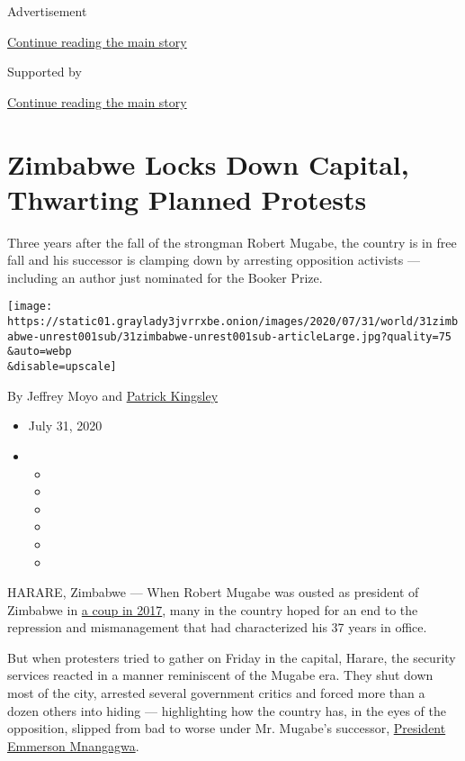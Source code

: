 Advertisement

\protect\hyperlink{after-top}{Continue reading the main story}

Supported by

\protect\hyperlink{after-sponsor}{Continue reading the main story}

\hypertarget{zimbabwe-locks-down-capital-thwarting-planned-protests}{%
\section{Zimbabwe Locks Down Capital, Thwarting Planned
Protests}\label{zimbabwe-locks-down-capital-thwarting-planned-protests}}

Three years after the fall of the strongman Robert Mugabe, the country
is in free fall and his successor is clamping down by arresting
opposition activists --- including an author just nominated for the
Booker Prize.

\texttt{[image: https://static01.graylady3jvrrxbe.onion/images/2020/07/31/world/31zimbabwe-unrest001sub/31zimbabwe-unrest001sub-articleLarge.jpg?quality=75\\\&auto=webp\\\&disable=upscale]}

By Jeffrey Moyo and
\href{https://www.nytimes3xbfgragh.onion/by/patrick-kingsley}{Patrick
Kingsley}

\begin{itemize}
\item
  July 31, 2020
\item
  \begin{itemize}
  \item
  \item
  \item
  \item
  \item
  \item
  \end{itemize}
\end{itemize}

HARARE, Zimbabwe --- When Robert Mugabe was ousted as president of
Zimbabwe in
\href{https://www.nytimes3xbfgragh.onion/2017/11/21/world/africa/zimbabwe-mugabe-mnangagwa.html}{a
coup in 2017}, many in the country hoped for an end to the repression
and mismanagement that had characterized his 37 years in office.

But when protesters tried to gather on Friday in the capital, Harare,
the security services reacted in a manner reminiscent of the Mugabe era.
They shut down most of the city, arrested several government critics and
forced more than a dozen others into hiding --- highlighting how the
country has, in the eyes of the opposition, slipped from bad to worse
under Mr. Mugabe's successor,
\href{https://www.nytimes3xbfgragh.onion/2019/08/10/world/africa/zimbabwe-president-emmerson-mnangagwa-mugabe.html}{President
Emmerson Mnangagwa}.

